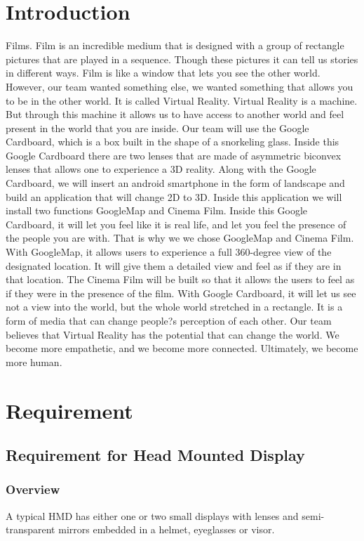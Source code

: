 \documentclass[12pt]{article}
\begin{document}
\section{Introduction}

Films. Film is an incredible medium that is designed with a group of rectangle pictures that are played in a sequence. Though these pictures it can tell us stories in different ways. Film is like a window that lets you see the other world. However, our team wanted something else, we wanted something that allows you to be in the other world. It is called Virtual Reality.  Virtual Reality is a machine. But through this machine it allows us to have access to another world and feel present in the world that you are inside. Our team will use the Google Cardboard, which is a box built in the shape of a snorkeling glass. Inside this Google Cardboard there are two lenses that are made of asymmetric biconvex lenses that allows one to experience a 3D reality. Along with the Google Cardboard, we will insert an android smartphone in the form of landscape and build an application that will change 2D to 3D. Inside this application we will install two functions GoogleMap and Cinema Film.   Inside this Google Cardboard, it will let you feel like it is real life, and let you feel the presence of the people you are with. That is why we we chose GoogleMap and Cinema Film. With GoogleMap, it allows users to experience a full 360-degree view of the designated location. It will give them a detailed view and feel as if they are in that location. The Cinema Film will be built so that it allows the users to feel as if they were in the presence of the film.   With Google Cardboard, it will let us see not a view into the world, but the whole world stretched in a rectangle. It is a form of media that can change people?s perception of each other. Our team believes that Virtual Reality has the potential that can change the world. We become more empathetic, and we become more connected. Ultimately, we become more human.

\section{Requirement}
\subsection {Requirement for Head Mounted Display}

\subsubsection{Overview}
A typical HMD has either one or two small displays with lenses and semi-transparent mirrors embedded in a helmet, eyeglasses or visor.
\end{document}
